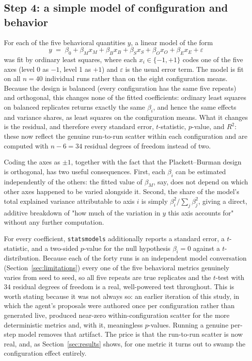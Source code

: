 \documentclass[11pt]{article}
\begin{document}
\subsection{Step 4: a simple model of configuration and behavior}
\label{sec:surrogate}

For each of the five behavioral quantities $y$, a linear model of the form
\[
y \;=\; \beta_0 + \beta_M x_M + \beta_B x_B + \beta_S x_S + \beta_O x_O + \beta_E x_E + \varepsilon
\]
was fit by ordinary least squares, where each $x_i \in \{-1,+1\}$ codes one of the five axes (level 0 as $-1$, level 1 as $+1$) and $\varepsilon$ is the usual error term. The model is fit on all $n=40$ individual runs rather than on the eight configuration means. Because the design is balanced (every configuration has the same five repeats) and orthogonal, this changes none of the fitted coefficients: ordinary least squares on balanced replicates returns exactly the same $\beta_i$, and hence the same effects and variance shares, as least squares on the configuration means. What it changes is the residual, and therefore every standard error, $t$-statistic, $p$-value, and $R^2$: these now reflect the genuine run-to-run scatter within each configuration and are computed with $n-6=34$ residual degrees of freedom instead of two.

Coding the axes as $\pm 1$, together with the fact that the Plackett--Burman design is orthogonal, has two useful consequences. First, each $\beta_i$ can be estimated independently of the others: the fitted value of $\beta_M$, say, does not depend on which other axes happened to be varied alongside it. Second, the share of the model's total explained variance attributable to axis $i$ is simply $\beta_i^2 / \sum_j \beta_j^2$, giving a direct, additive breakdown of "how much of the variation in $y$ this axis accounts for" without any further computation.

For every coefficient, \texttt{statsmodels} additionally reports a standard error, a $t$-statistic, and a two-sided $p$-value for the null hypothesis $\beta_i = 0$ against a $t$-distribution. Because each of the forty runs is an independent model conversation (Section~\ref{sec:limitations}) every one of the five behavioral metrics genuinely varies from seed to seed, so all five repeats are true replicates and the $t$-test with $34$ residual degrees of freedom is a real, well-powered test throughout. This is worth stating because it was not always so: an earlier iteration of this study, in which the agent's proposals were authored once per configuration rather than generated live, produced near-zero within-configuration scatter for the more deterministic metrics and, with it, meaningless $p$-values. Running a genuine per-step model removes that artifact. The price is that the run-to-run scatter is now real, and, as Section~\ref{sec:results} shows, for one metric it turns out to swamp the configuration effect entirely.
\end{document}

